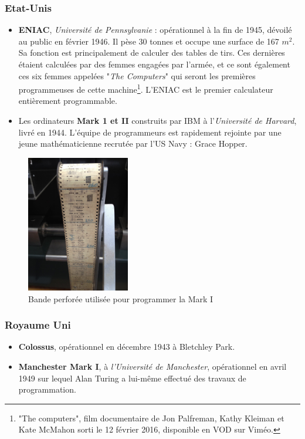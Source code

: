 \documentclass[a4paper,11pt]{book}
\begin{document}
\subsubsection{Etat-Unis}
\begin{itemize}
    \item \textbf{ENIAC}, \textit{Université de Pennsylvanie} :  opérationnel à la fin de 1945, dévoilé au public en février 1946. Il pèse 30 tonnes et occupe une surface de 167 $m^2$. Sa fonction est principalement de calculer des tables de tirs. Ces dernières étaient calculées par des femmes engagées par l'armée, et ce sont également ces six femmes appelées "\textit{The Computers}" qui seront les premières programmeuses de cette machine\footnote{"The computers", film documentaire de Jon Palfreman, Kathy Kleiman et Kate McMahon sorti le 12 février 2016, disponible en VOD sur Viméo.}. L'ENIAC est le premier calculateur entièrement programmable.
    \item Les ordinateurs \textbf{Mark 1 et II} construits par IBM à l'\textit{Université de Harvard}, livré en 1944. L'équipe de programmeurs est rapidement rejointe par une jeune mathématicienne recrutée par l'US Navy : Grace Hopper.
\end{itemize}

\begin{figure}[h]
    \centering
    \includegraphics[width=0.4\textwidth]{media/machines/Harvard_Mark_I_program_tape.agr.jpg}
    \caption{Bande perforée utilisée pour programmer la Mark I}
\end{figure}

\subsubsection{Royaume Uni}
\begin{itemize}
    \item \textbf{Colossus}, opérationnel en décembre 1943 à Bletchley Park.
    \item \textbf{Manchester Mark I}, à \textit{l'Université de Manchester}, opérationnel en avril 1949 sur lequel Alan Turing a lui-même effectué des travaux de programmation.
\end{itemize}
\end{document}
